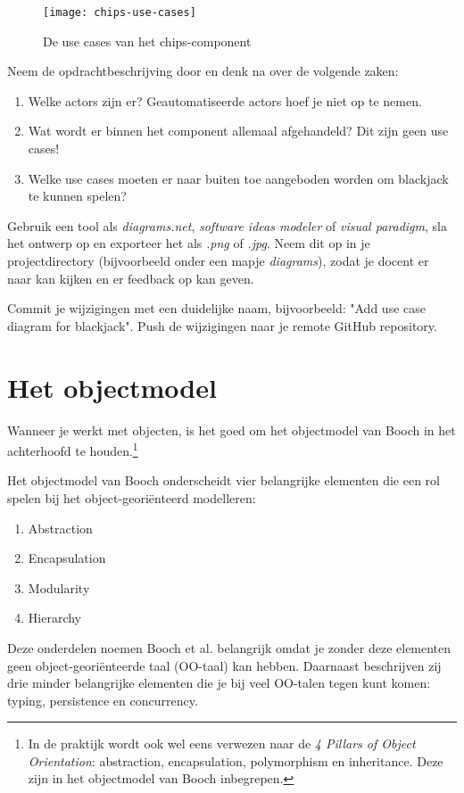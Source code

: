 \begin{figure}[H]
    \centering
    \texttt{[image: chips-use-cases]}
    \caption{De use cases van het chips-component}
    \label{fig:chips-use-cases}
\end{figure}

Neem de opdrachtbeschrijving door en denk na over de volgende zaken:
\begin{enumerate}
    \item Welke actors zijn er? Geautomatiseerde actors hoef je niet op te nemen.
    \item Wat wordt er binnen het component allemaal afgehandeld? Dit zijn geen use cases!
    \item Welke use cases moeten er naar buiten toe aangeboden worden om blackjack te kunnen spelen?
\end{enumerate}

Gebruik een tool als \textit{diagrams.net}, \textit{software ideas modeler} of \textit{visual paradigm},
sla het ontwerp op en exporteer het als \textit{.png} of \textit{.jpg}. 
Neem dit op in je projectdirectory (bijvoorbeeld onder een mapje \textit{diagrams}),
zodat je docent er naar kan kijken en er feedback op kan geven.

Commit je wijzigingen met een duidelijke naam, 
bijvoorbeeld: "Add use case diagram for blackjack". 
Push de wijzigingen naar je remote GitHub repository.

\section{Het objectmodel}
Wanneer je werkt met objecten, is het goed om het objectmodel van Booch in 
het achterhoofd te houden.\footnote{
    In de praktijk wordt ook wel eens verwezen naar de \textit{4 Pillars of Object Orientation}: 
    abstraction, encapsulation, polymorphism en inheritance. 
    Deze zijn in het objectmodel van Booch inbegrepen.
}

Het objectmodel van Booch onderscheidt vier belangrijke elementen 
die een rol spelen bij het object-georiënteerd modelleren:
\begin{enumerate}
    \item Abstraction
    \item Encapsulation 
    \item Modularity 
    \item Hierarchy
\end{enumerate}

Deze onderdelen noemen Booch et al. belangrijk omdat je 
zonder deze elementen geen object-georiënteerde taal (OO-taal) kan hebben.
Daarnaast beschrijven zij drie minder belangrijke elementen die je 
bij veel OO-talen tegen kunt komen: typing, persistence en concurrency.

